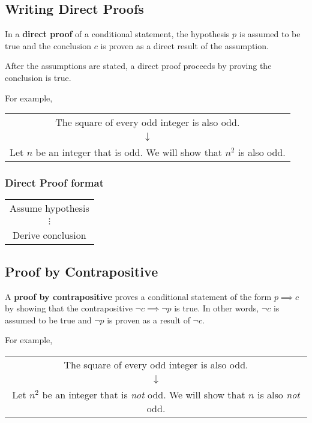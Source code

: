 \subsection{Writing Direct Proofs}
In a \textbf{direct proof} of a conditional statement, the hypothesis $p$ is assumed
to be true and the conclusion $c$ is proven as a direct result of the assumption.

After the assumptions are stated, a direct proof proceeds by proving the conclusion is true.

For example,
\begin{center}
  \begin{tabular}{c}
    The square of every odd integer is also odd. \\
    $\downarrow$                                 \\
    Let $n$ be an integer that is odd. We will show that $n^2$ is also odd.
  \end{tabular}
\end{center}
\subsubsection*{Direct Proof format}
\begin{center}
  \begin{tabular}{|c|}
    \hline
    Assume hypothesis \\
    $\vdots$          \\
    Derive conclusion \\
    \hline
  \end{tabular}
\end{center}

\subsection{Proof by Contrapositive}
A \textbf{proof by contrapositive} proves a conditional statement of the form $p \implies c$
by showing that the contrapositive $\lnot c \implies \lnot p$ is true.
In other words, $\lnot c$ is assumed to be true and $\lnot p$ is proven as a result of $\lnot c$.

For example,
\begin{center}
  \begin{tabular}{c}
    The square of every odd integer is also odd. \\
    $\downarrow$                                 \\
    Let $n^2$ be an integer that is \textit{not} odd. We will show that $n$ is also \textit{not} odd.
  \end{tabular}
\end{center}
